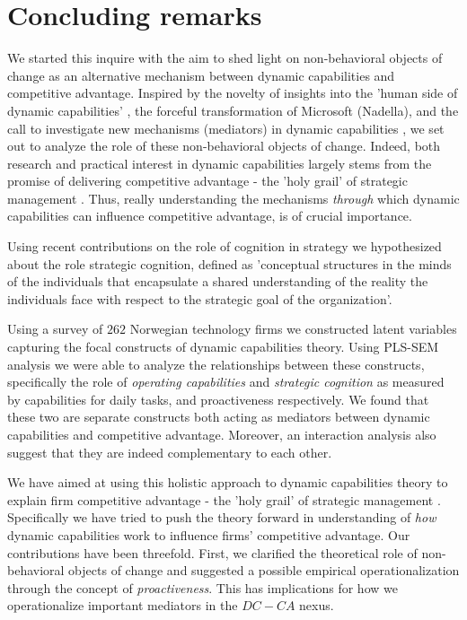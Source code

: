 \documentclass[review,fleqn]{elsarticle}\usepackage[]{graphicx}\usepackage[]{color}
\begin{document}
\section*{Concluding remarks}

We started this inquire with the aim to shed light on non-behavioral objects of change as
an alternative mechanism between dynamic capabilities and competitive advantage. Inspired
by the novelty of insights into the 'human side of dynamic capabilities'
\citep{Verona2011,Zollo2016}, the forceful transformation of Microsoft (Nadella), and the
call to investigate new mechanisms (mediators) in dynamic capabilities
\citep{Schilke2018}, we set out to analyze the role of these non-behavioral objects of
change. Indeed, both research and practical interest in dynamic capabilities largely stems
from the promise of delivering competitive advantage - the 'holy grail' of strategic
management \citep{Helfat2007,Schilke2018,Peteraf2013}. Thus, really understanding the
mechanisms \emph{through} which dynamic capabilities can influence competitive advantage,
is of crucial importance.

Using recent contributions on the role of cognition in strategy
\citep{Gavetti2012,Zollo2016,Verona2011} we hypothesized about the role strategic
cognition, defined as 'conceptual structures in the minds of the individuals that
encapsulate a shared understanding of the reality the individuals face with respect to
the strategic goal of the organization'.

Using a survey of $262$ Norwegian technology firms we constructed latent variables
capturing the focal constructs of dynamic capabilities theory. Using PLS-SEM analysis we
were able to analyze the relationships between these constructs, specifically the role of
\emph{operating capabilities} and \emph{strategic cognition} as measured by capabilities
for daily tasks, and proactiveness respectively. We found that these two are separate
constructs both acting as mediators between dynamic capabilities and competitive
advantage. Moreover, an interaction analysis also suggest that they are indeed
complementary to each other.

We have aimed at using this holistic approach to dynamic capabilities theory to explain
firm competitive advantage - the 'holy grail' of strategic management \citep{Schilke2018}.
Specifically we have tried to push the theory forward in understanding of \emph{how}
dynamic capabilities work to influence firms' competitive advantage. Our contributions
have been threefold. First, we clarified the theoretical role of non-behavioral objects of
change and suggested a possible empirical operationalization through the concept of
\emph{proactiveness}. This has implications for how we operationalize important mediators
in the $DC-CA$ nexus.
\end{document}

